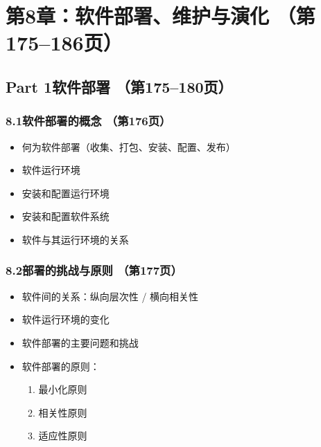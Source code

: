 \documentclass[12pt,a4paper]{ctexart}
\begin{document}
\vspace{0.3cm}
\section{第8章：软件部署、维护与演化 \hfill（第175--186页）}

\subsection{Part 1\quad 软件部署 \hfill（第175--180页）}

\subsubsection{8.1\quad 软件部署的概念 \hfill（第176页）}
\begin{itemize}
    \item 何为软件部署（收集、打包、安装、配置、发布）
    \item 软件运行环境
    \item 安装和配置运行环境
    \item 安装和配置软件系统
    \item 软件与其运行环境的关系
\end{itemize}

\subsubsection{8.2\quad 部署的挑战与原则 \hfill（第177页）}
\begin{itemize}
    \item 软件间的关系：纵向层次性 / 横向相关性
    \item 软件运行环境的变化
    \item 软件部署的主要问题和挑战
    \item 软件部署的原则：
    \begin{enumerate}
        \item 最小化原则
        \item 相关性原则
        \item 适应性原则
    \end{enumerate}
\end{itemize}
\end{document}
